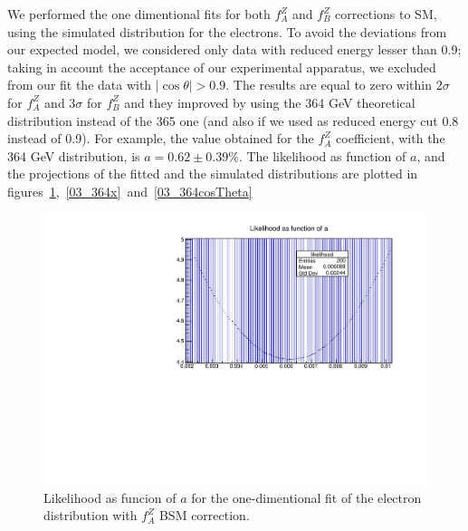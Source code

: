We performed the one dimentional fits for both $f_A^Z$ and $f_B^Z$ corrections to SM, using the simulated distribution for the electrons. To avoid the deviations from our expected model, we considered only data with reduced energy lesser than 0.9; taking in account the acceptance of our experimental apparatus, we excluded from our fit the data with $\lvert\cos\theta\rvert > 0.9$. The results are equal to zero within $2\sigma$ for $f_A^Z$ and $3\sigma$ for $f_B^Z$ and they improved by using the 364 GeV theoretical distribution instead of the 365 one (and also if we used as reduced energy cut 0.8 instead of 0.9). For example, the value obtained for the $f_A^Z$ coefficient, with the 364 GeV distribution, is $ a = 0.62 \pm 0.39 \%$. The likelihood as function of $a$, and the projections of the fitted and the simulated distributions are plotted in figures~\ref{03_364likelihood},~\ref{03_364x}~and~\ref{03_364cosTheta}

\begin{figure} [htp]
\centering
\includegraphics[scale=0.7]{364likelihood.pdf}
\caption{Likelihood as funcion of $a$ for the one-dimentional fit of the electron distribution with $f_A^Z$ BSM correction.}
\label{03_364likelihood}
\end{figure}

